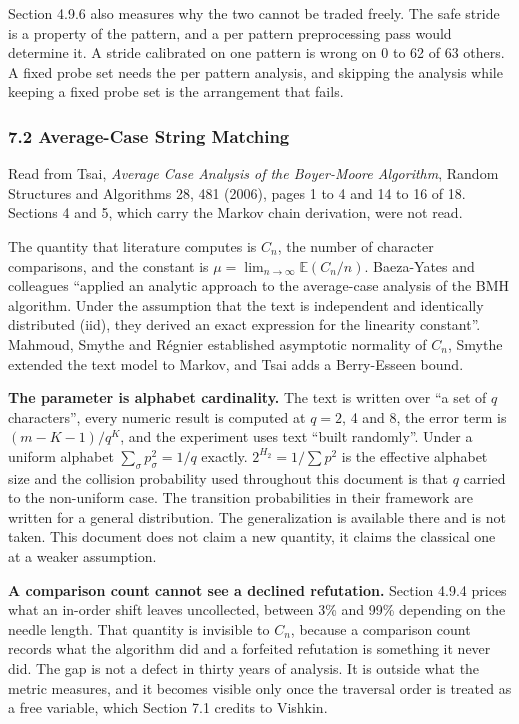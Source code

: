 Section 4.9.6 also measures why the two cannot be traded freely. The safe stride is a property of the pattern, and a per pattern preprocessing pass would determine it. A stride calibrated on one pattern is wrong on 0 to 62 of 63 others. A fixed probe set needs the per pattern analysis, and skipping the analysis while keeping a fixed probe set is the arrangement that fails.

\subsubsection{7.2 Average-Case String Matching}

Read from Tsai, \emph{Average Case Analysis of the Boyer-Moore Algorithm}, Random Structures and Algorithms 28, 481 (2006), pages 1 to 4 and 14 to 16 of 18. Sections 4 and 5, which carry the Markov chain derivation, were not read.

The quantity that literature computes is \(C_n\), the number of character comparisons, and the constant is \(\mu = \lim_{n\to\infty} \mathbb{E}(C_n/n)\). Baeza-Yates and colleagues ``applied an analytic approach to the average-case analysis of the BMH algorithm. Under the assumption that the text is independent and identically distributed (iid), they derived an exact expression for the linearity constant''. Mahmoud, Smythe and Régnier established asymptotic normality of \(C_n\), Smythe extended the text model to Markov, and Tsai adds a Berry-Esseen bound.

\noindent\textbf{The parameter is alphabet cardinality.} The text is written over ``a set of \(q\) characters'', every numeric result is computed at \(q = 2\), 4 and 8, the error term is \((m-K-1)/q^K\), and the experiment uses text ``built randomly''. Under a uniform alphabet \(\sum_\sigma p_\sigma^2 = 1/q\) exactly. \(2^{H_2} = 1/\sum p^2\) is the effective alphabet size and the collision probability used throughout this document is that \(q\) carried to the non-uniform case. The transition probabilities in their framework are written for a general distribution. The generalization is available there and is not taken. This document does not claim a new quantity, it claims the classical one at a weaker assumption.

\noindent\textbf{A comparison count cannot see a declined refutation.} Section 4.9.4 prices what an in-order shift leaves uncollected, between 3\% and 99\% depending on the needle length. That quantity is invisible to \(C_n\), because a comparison count records what the algorithm did and a forfeited refutation is something it never did. The gap is not a defect in thirty years of analysis. It is outside what the metric measures, and it becomes visible only once the traversal order is treated as a free variable, which Section 7.1 credits to Vishkin.

